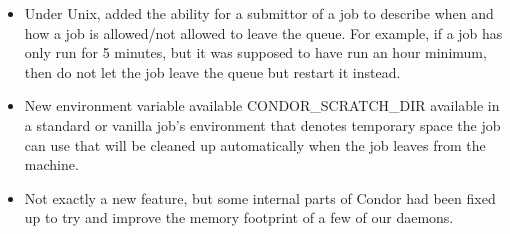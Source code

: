 \begin{itemize}
\item Under Unix, added the ability for a submittor of a job to describe when
and how a job is allowed/not allowed to leave the queue. For example, if
a job has only run for 5 minutes, but it was supposed to have run an hour 
minimum, then do not let the job leave the queue but restart it instead.

\item New environment variable available CONDOR\_SCRATCH\_DIR available
in a standard or vanilla job's environment that denotes temporary space
the job can use that will be cleaned up automatically when the job leaves
from the machine.

\item Not exactly a new feature, but some internal parts of Condor had been
fixed up to try and improve the memory footprint of a few of our daemons.

\end{itemize}

